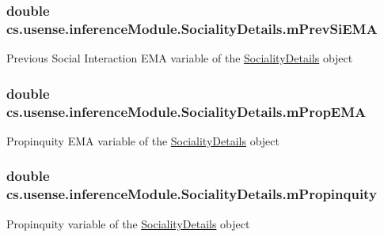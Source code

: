\subsubsection[{m\+Prev\+Si\+E\+M\+A}]{\setlength{\rightskip}{0pt plus 5cm}double cs.\+usense.\+inference\+Module.\+Sociality\+Details.\+m\+Prev\+Si\+E\+M\+A}\label{classcs_1_1usense_1_1inference_module_1_1_sociality_details_a28f866785375e83e1b1a917f40299fac}
Previous Social Interaction E\+M\+A variable of the \hyperlink{classcs_1_1usense_1_1inference_module_1_1_sociality_details}{Sociality\+Details} object \hypertarget{classcs_1_1usense_1_1inference_module_1_1_sociality_details_ad093550a5875409e710d94a2e9c32011}{}
\subsubsection[{m\+Prop\+E\+M\+A}]{\setlength{\rightskip}{0pt plus 5cm}double cs.\+usense.\+inference\+Module.\+Sociality\+Details.\+m\+Prop\+E\+M\+A}\label{classcs_1_1usense_1_1inference_module_1_1_sociality_details_ad093550a5875409e710d94a2e9c32011}
Propinquity E\+M\+A variable of the \hyperlink{classcs_1_1usense_1_1inference_module_1_1_sociality_details}{Sociality\+Details} object \hypertarget{classcs_1_1usense_1_1inference_module_1_1_sociality_details_af5fa1a890198a03f5618b1df1d8747c4}{}
\subsubsection[{m\+Propinquity}]{\setlength{\rightskip}{0pt plus 5cm}double cs.\+usense.\+inference\+Module.\+Sociality\+Details.\+m\+Propinquity}\label{classcs_1_1usense_1_1inference_module_1_1_sociality_details_af5fa1a890198a03f5618b1df1d8747c4}
Propinquity variable of the \hyperlink{classcs_1_1usense_1_1inference_module_1_1_sociality_details}{Sociality\+Details} object \hypertarget{classcs_1_1usense_1_1inference_module_1_1_sociality_details_a6fe385a5a4ec1863bc015a2e7a519289}{}
